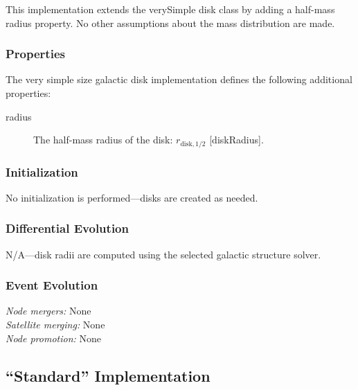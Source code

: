 This implementation extends the {\normalfont \ttfamily verySimple} disk class by adding a half-mass radius property. No other assumptions about the mass distribution are made.

\subsubsection{Properties}

The very simple size galactic disk implementation defines the following additional properties:
\begin{description}
 \item [{\normalfont \ttfamily radius}] The half-mass radius of the disk: $r_\mathrm{disk, 1/2}$ [{\normalfont \ttfamily diskRadius}].
\end{description}

\subsubsection{Initialization}

No initialization is performed---disks are created as needed.

\subsubsection{Differential Evolution}

N/A---disk radii are computed using the selected galactic structure solver.

\subsubsection{Event Evolution}

\noindent\emph{Node mergers:} None\\

\noindent\emph{Satellite merging:} None\\

\noindent\emph{Node promotion:} None\\

\subsection{``Standard'' Implementation}\label{sec:DiskStandard}

